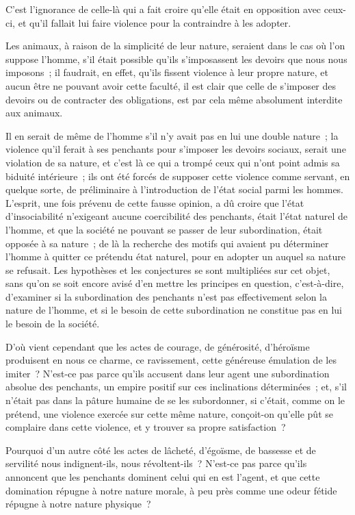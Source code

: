 \documentclass[french,twoside]{book} %
\begin{document}
C’est l’ignorance de celle-là qui a fait croire qu’elle était en opposition avec ceux-ci, et qu’il fallait lui faire violence pour la contraindre à les adopter.\par
Les animaux, à raison de la simplicité de leur nature, seraient dans le cas où l’on suppose l’homme, s’il était possible qu’ils s’imposassent les devoirs que nous nous imposons ; il faudrait, en effet, qu’ils fissent violence à leur propre nature, et aucun être ne pouvant avoir cette faculté, il est clair que celle de s’imposer des devoirs ou de contracter des obligations, est par cela même absolument interdite aux animaux.\par
Il en serait de même de l’homme s’il n’y avait pas en lui une double nature ; la violence qu’il ferait à ses penchants pour s’imposer les devoirs sociaux, serait une violation de sa nature, et c’est là ce qui a trompé ceux qui n’ont point admis sa biduité intérieure ; ils ont été forcés de supposer cette violence comme servant, en quelque sorte, de préliminaire à l’introduction de l’état social parmi les hommes. L’esprit, une fois prévenu de cette fausse opinion, a dû croire que l’état d’insociabilité n’exigeant aucune coercibilité des penchants, était l’état naturel de l’homme, et que la société ne pouvant se passer de leur subordination, était opposée à sa nature ; de là la recherche des motifs qui avaient pu déterminer l’homme à quitter ce prétendu état naturel, pour en adopter un auquel sa nature se refusait. Les hypothèses et les conjectures se sont multipliées sur cet objet, sans qu’on se soit encore avisé d’en mettre les principes en question, c’est-à-dire, d’examiner si la subordination des penchants n’est pas effectivement selon la nature de l’homme, et si le besoin de cette subordination ne constitue pas en lui le besoin de la société.\par
D’où vient cependant que les actes de courage, de générosité, d’héroïsme produisent en nous ce charme, ce ravissement, cette généreuse émulation de les imiter ? N’est-ce pas parce qu’ils accusent dans leur agent une subordination absolue des penchants, un empire positif sur ces inclinations déterminées ; et, s’il n’était pas dans la pâture humaine de se les subordonner, si c’était, comme on le prétend, une violence exercée sur cette même nature, conçoit-on qu’elle pût se complaire dans cette violence, et y trouver sa propre satisfaction ?\par
Pourquoi d’un autre côté les actes de lâcheté, d’égoïsme, de bassesse et de servilité nous indignent-ils, nous révoltent-ils ? N’est-ce pas parce qu’ils annoncent que les penchants dominent celui qui en est l’agent, et que cette domination répugne à notre nature morale, à peu près comme une odeur fétide répugne à notre nature physique ?\par
\end{document}
